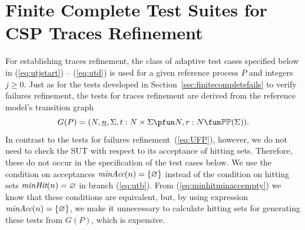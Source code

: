\documentclass[3p,times]{elsarticle}
\newcommand{\epass}{{\text{\it pass}}}
\newcommand{\efail}{{\text{\it fail}}}
\newcommand{\ii}[1]{\underline{#1}}
\newcommand{\minaccs}{\text{\it minAcc}}
\newcommand{\minhits}{\text{\it minHit}}
\begin{document}
\section{Finite Complete Test Suites for CSP Traces Refinement}
\label{sec:finitecomplete}

For establishing traces refinement, the   class of adaptive test
cases specified below in (\ref{eq:utjstart}) -- (\ref{eq:utd})
is used for a given reference process $P$ and  integers $j \ge 0$.
Just as for the tests developed  in Section~\ref{sec:finitecompletefails} to
verify failures refinement, the tests for traces refinement are derived from
the reference model's transition graph
$$
G(P) = ( N, \ii n, \Sigma, t : N\times\Sigma \pfun N, r : N \fun \mathbb{P}\mathbb{P}(\Sigma)).
$$
In contrast to the tests for failures refinement~(\ref{eq:UFP}), however, we
do not need to check the SUT with respect to its acceptance of hitting sets.
Therefore, these do not occur in the specification of the test cases below.
We use the condition on acceptances $\minaccs(n) = \{ \varnothing \}$ instead
of the condition on hitting sets $\minhits(n) = \varnothing$ in branch
(\ref{eq:utb}). From (\ref{eq:minhitminaccempty}) we know that these
conditions are equivalent, but, by using  expression $\minaccs(n) = \{ \varnothing
\}$,  we make it unnecessary to calculate hitting sets for
generating these tests from $G(P)$, which is expensive.

\end{document}
